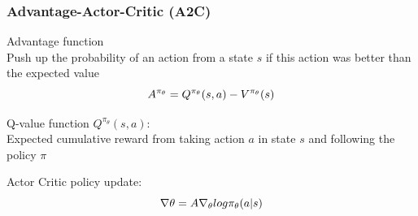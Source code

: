 \begin{frame}
    \frametitle{Advantage-Actor-Critic (A2C)}

\begin{PraesentationAufzaehlung}
	\item Advantage function\\
		Push up the probability of an action from a state $s$ if this action was better than the expected value
		\begin{equation}
		\mathnormal{
		A^{\pi_\theta} = Q^{\pi_\theta}(s, a) - V^{\pi_\theta}(s)
		}
		\end{equation}
	\item Q-value function $Q^{\pi_\theta}(s, a)$:\\ 
		Expected cumulative reward from taking action $a$ in state $s$ and following the policy $\pi$
	\item Actor Critic policy update:
	\begin{equation}
		\mathnormal{
		\nabla \theta = A \nabla_\theta log \pi_\theta (a | s)}
	\end{equation}
\end{PraesentationAufzaehlung}

\end{frame}
\clearpage










